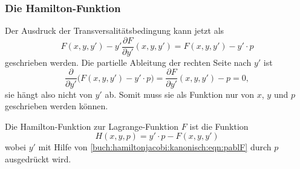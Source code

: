 %
%
\subsubsection{Die Hamilton-Funktion}
Der Ausdruck der Transversalitätsbedingung kann jetzt
als 
\[
F(x,y,y') - y'\frac{\partial F}{\partial y'}(x,y,y')
=
F(x,y,y') - y'\cdot p
\]
geschrieben werden.
Die partielle Ableitung der rechten Seite nach $y'$ ist
\[
\frac{\partial}{\partial y'}
\biggl(
F(x,y,y') - y'\cdot p
\biggr)
=
\frac{\partial F}{\partial y'}(x,y,y') - p
=
0,
\]
sie hängt also nicht von $y'$ ab.
Somit muss sie als Funktion nur von $x$, $y$ und $p$ geschrieben werden
können.

\begin{definition}
\label{buch:hamiltonjacobi:kanonisch:def:hamilton-funktion}
Die Hamilton-Funktion zur Lagrange-Funktion $F$ ist die Funktion 
\[
H(x,y,p)
=
y'\cdot p - F(x,y,y')
\]
wobei $y'$ mit Hilfe von \eqref{buch:hamiltonjacobi:kanonisch:eqn:pablF}
durch $p$ ausgedrückt wird.
\end{definition}

